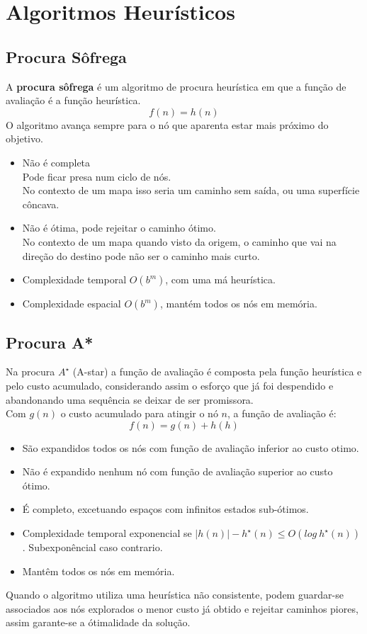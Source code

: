 \documentclass[]{report}
\begin{document}
\section{Algoritmos Heurísticos}
\subsection{Procura Sôfrega}
A \textbf{procura sôfrega} é um algoritmo de procura heurística em que a função de avaliação é a função heurística.
$$f(n) = h(n)$$
O algoritmo avança sempre para o nó que aparenta estar mais próximo do objetivo.
\begin{itemize}
	\item Não é completa\\
	Pode ficar presa num ciclo de nós.\\
	No contexto de um mapa isso seria um caminho sem saída, ou uma superfície côncava.
	\item Não é ótima, pode rejeitar o caminho ótimo.\\
	No contexto de um mapa quando visto da origem, o caminho que vai na direção do destino pode não ser o caminho mais curto.
	\item Complexidade temporal $O(b^m)$, com uma má heurística.
	\item Complexidade espacial $O(b^m)$, mantém todos os nós em memória.
\end{itemize}
\subsection{Procura A*}
Na procura $A^\star$ (A-star) a função de avaliação é composta pela função heurística e pelo custo acumulado, considerando assim o esforço que já foi despendido e abandonando uma sequência se deixar de ser promissora.\\[2mm]
Com $g(n)$ o custo acumulado para atingir o nó $n$, a função de avaliação é:
$$f(n) = g(n) + h(h)$$
\begin{itemize}
	\item São expandidos todos os nós com função de avaliação inferior ao custo otimo.
	\item Não é expandido nenhum nó com função de avaliação superior ao custo ótimo.
	\item É completo, excetuando espaços com infinitos estados sub-ótimos.
	\item Complexidade temporal exponencial se $|h(n)| - h^\star (n) \leq O(log \> h^\star (n))$. Subexponêncial caso contrario.
	\item Mantêm todos os nós em memória.
\end{itemize}
Quando o algoritmo utiliza uma heurística não consistente, podem guardar-se associados aos nós explorados o menor custo já obtido e rejeitar caminhos piores, assim garante-se a ótimalidade da solução.
\clearpage
\end{document}
